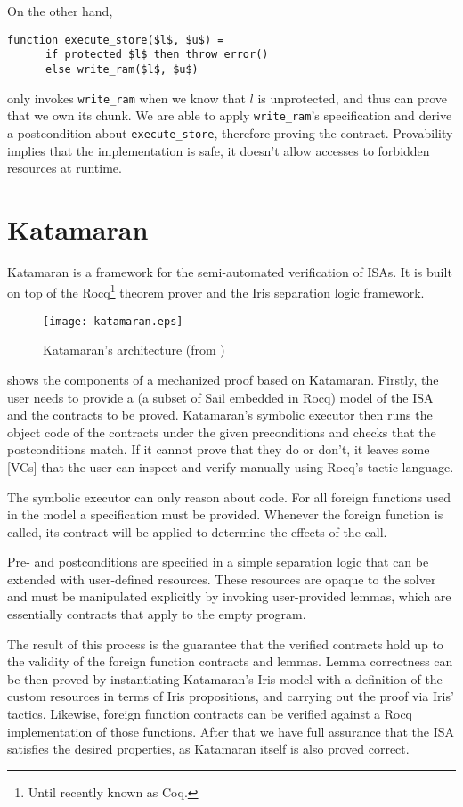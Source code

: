 On the other hand,
\begin{lstlisting}[language=sail, mathescape]
    function execute_store($l$, $u$) =
      if protected $l$ then throw error()
      else write_ram($l$, $u$)
\end{lstlisting}
only invokes \texttt{write\_ram} when we know that \(l\) is unprotected, and thus can prove that we own its chunk. We are able to apply \texttt{write\_ram}'s specification and derive a postcondition about \texttt{execute\_store}, therefore proving the contract. Provability implies that the implementation is safe, \ie it doesn't allow accesses to forbidden resources at runtime.

\section{Katamaran}
\label{sec:katamaran}

Katamaran \cite{Huyghebaert2023} is a framework for the semi-automated verification of ISAs. It is built on top of the Rocq\footnote{Until recently known as Coq.} theorem prover and the Iris \cite{Jung2018} separation logic framework.

\begin{figure}[htb]
  \centering
  \texttt{[image: katamaran.eps]}
  \caption{Katamaran's architecture (from \cite{Huyghebaert2023})}
  \label{fig:katamaran}
\end{figure}

 shows the components of a mechanized proof based on Katamaran. Firstly, the user needs to provide a \usail (a subset of Sail embedded in Rocq) model of the ISA and the contracts to be proved. Katamaran's symbolic executor then runs the object code of the contracts under the given preconditions and checks that the postconditions match. If it cannot prove that they do or don't, it leaves some [VCs] that the user can inspect and verify manually using Rocq's tactic language.

The symbolic executor can only reason about \usail code. For all foreign functions used in the model a specification must be provided. Whenever the foreign function is called, its contract will be applied to determine the effects of the call.

Pre- and postconditions are specified in a simple separation logic that can be extended with user-defined resources. These resources are opaque to the solver and must be manipulated explicitly by invoking user-provided lemmas, which are essentially contracts that apply to the empty program.

The result of this process is the guarantee that the verified contracts hold up to the validity of the foreign function contracts and lemmas. Lemma correctness can be then proved by instantiating Katamaran's Iris model with a definition of the custom resources in terms of Iris propositions, and carrying out the proof via Iris' tactics. Likewise, foreign function contracts can be verified against a Rocq implementation of those functions. After that we have full assurance that the ISA satisfies the desired properties, as Katamaran itself is also proved correct.

